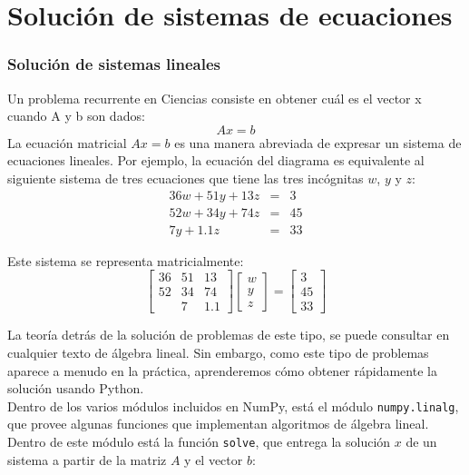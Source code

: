 \section{Soluci\'{o}n de sistemas de ecuaciones}
\begin{frame}
\frametitle{Soluci\'{o}n de sistemas lineales}
\fontsize{12}{12}\selectfont
Un problema recurrente en Ciencias consiste en obtener cu\'{a}l es el vector x cuando A y b son dados:
\[Ax=b\]
La ecuaci\'{o}n matricial $Ax=b$ es una manera abreviada de expresar un sistema de ecuaciones lineales. Por ejemplo, la ecuaci\'{o}n del diagrama es equivalente al siguiente sistema de tres ecuaciones que tiene las tres inc\'{o}gnitas $w$, $y$ y $z$:
\begin{eqnarray*}
36w+51y+13z &=& 3 \\
52w+34y+74z &=& 45 \\
7y+1.1z &=& 33
\end{eqnarray*}
\end{frame}
\begin{frame}
Este sistema se representa matricialmente:
\[ \begin{bmatrix}
36 & 51 & 13 \\
52 & 34 & 74 \\
 & 7 &1.1
\end{bmatrix}
\begin{bmatrix}
w \\
y \\
z
\end{bmatrix} =
\begin{bmatrix}
3 \\
45 \\
33
\end{bmatrix}
\]
\end{frame}
\begin{frame}[fragile]
La teor\'{i}a detr\'{a}s de la soluci\'{o}n de problemas de este tipo, se puede consultar en cualquier texto de \'{a}lgebra lineal. Sin embargo, como este tipo de problemas aparece a menudo en la pr\'{a}ctica, aprenderemos c\'{o}mo obtener r\'{a}pidamente la soluci\'{o}n usando Python.
\\
\bigskip
Dentro de los varios m\'{o}dulos incluidos en NumPy, est\'{a} el m\'{o}dulo \texttt{numpy.linalg}, que provee algunas funciones que implementan algoritmos de \'{a}lgebra lineal. Dentro de este m\'{o}dulo est\'{a} la funci\'{o}n \texttt{solve}, que entrega la solución $x$ de un sistema a partir de la matriz $A$ y el vector $b$:
\end{frame}
